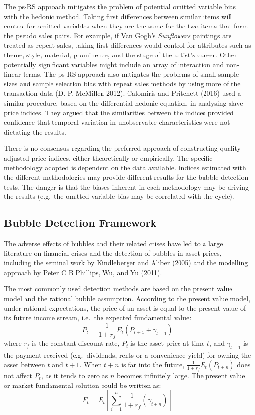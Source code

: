 \documentclass[]{elsarticle} %
\begin{document}
The ps-RS approach mitigates the problem of potential omitted variable
bias with the hedonic method. Taking first differences between similar
items will control for omitted variables when they are the same for the
two items that form the pseudo sales pairs. For example, if Van Gogh's
\emph{Sunflowers} paintings are treated as repeat sales, taking first
differences would control for attributes such as theme, style, material,
prominence, and the stage of the artist's career. Other potentially
significant variables might include an array of interaction and
non-linear terms. The ps-RS approach also mitigates the problems of
small sample sizes and sample selection bias with repeat sales methods
by using more of the transaction data (D. P. McMillen 2012). Calomiris
and Pritchett (2016) used a similar procedure, based on the differential
hedonic equation, in analysing slave price indices. They argued that the
similarities between the indices provided confidence that temporal
variation in unobservable characteristics were not dictating the
results.

There is no consensus regarding the preferred approach of constructing
quality-adjusted price indices, either theoretically or empirically. The
specific methodology adopted is dependent on the data available. Indices
estimated with the different methodologies may provide different results
for the bubble detection tests. The danger is that the biases inherent
in each methodology may be driving the results (e.g.~the omitted
variable bias may be correlated with the cycle).

\subsection{Bubble Detection
Framework}\label{bubble-detection-framework}

The adverse effects of bubbles and their related crises have led to a
large literature on financial crises and the detection of bubbles in
asset prices, including the seminal work by Kindleberger and Aliber
(2005) and the modelling approach by Peter C B Phillips, Wu, and Yu
(2011).

The most commonly used detection methods are based on the present value
model and the rational bubble assumption. According to the present value
model, under rational expectations, the price of an asset is equal to
the present value of its future income stream, i.e.~the expected
fundamental value: \[P_t = \frac{1}{1+r_f} E_t(P_{t+1} + \gamma_{t+1})\]
where \(r_f\) is the constant discount rate, \(P_t\) is the asset price
at time \(t\), and \(\gamma_{t+1}\) is the payment received
(e.g.~dividends, rents or a convenience yield) for owning the asset
between \(t\) and \(t+1\). When \(t+n\) is far into the future,
\(\frac{1}{1+r_f} E_t(P_{t+n})\) does not affect \(P_t\), as it tends to
zero as \(n\) becomes infinitely large. The present value or market
fundamental solution could be written as:
\[F_t = E_t[\sum_{i=1}^n \frac{1}{1+r_f} (\gamma_{t+n})]\]
\end{document}
